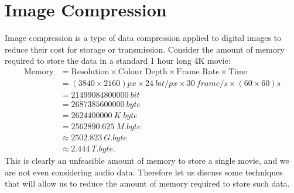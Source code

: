 \documentclass{article}
\begin{document}
\section{Image Compression}
Image compression is a type of data compression applied to digital
images to reduce their cost for storage or transmission. Consider the
amount of memory required to store the data in a standard 1 hour long
4K movie:
\begin{align*}
    \text{Memory} & = \text{Resolution} \times \text{Colour Depth} \times \text{Frame Rate} \times \text{Time}                                               \\
                  & = \left( 3840 \times 2160 \right) \unit{px} \times \qty{24}{bit/px} \times \qty{30}{frame/s} \times \left( 60 \times 60 \right) \unit{s} \\
                  & = \qty{21499084800000}{bit}                                                                                                              \\
                  & = \qty{2687385600000}{byte}                                                                                                              \\
                  & = \qty{2624400000}{K.byte}                                                                                                               \\
                  & = \qty{2562890.625}{M.byte}                                                                                                              \\
                  & \approx \qty{2502.823}{G.byte}                                                                                                           \\
                  & \approx \qty{2.444}{T.byte}.
\end{align*}
This is clearly an unfeasible amount of memory to store a single movie,
and we are not even considering audio data. Therefore let us discuss
some techniques that will allow us to reduce the amount of memory
required to store such data.
\end{document}
